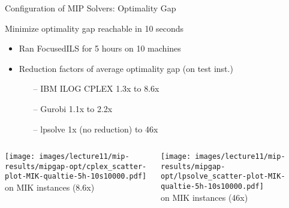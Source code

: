 \begin{frame}[c,fragile]{Configuration of MIP Solvers: Optimality Gap}

\begin{block}{Minimize optimality gap reachable in 10 seconds}
\begin{itemize}
        \item Ran FocusedILS for 5 hours on 10 machines
        

        \item Reduction factors of average optimality gap (on test inst.)
        \begin{itemize}
                \item[--] IBM ILOG CPLEX 1.3x to 8.6x
                \item[--] Gurobi 1.1x to 2.2x
                \item[--] lpsolve 1x (no reduction) to 46x
        \end{itemize}
\end{itemize}
\end{block}
        
\pause        
\vspace*{-0.6cm} 
    \begin{columns}
                                \begin{center}  \texttt{[image: images/lecture11/mip-results/mipgap-opt/cplex\_scatter-plot-MIK-qualtie-5h-10s10000.pdf]}\\
                                \footnotesize{\cplex{} on MIK instances (8.6x)}
                                \end{center}
                                \begin{center}  \texttt{[image: images/lecture11/mip-results/mipgap-opt/lpsolve\_scatter-plot-MIK-qualtie-5h-10s10000.pdf]}\\
                                \footnotesize{\lpsolve{} on MIK instances (46x)}%
                                \end{center}
    \end{columns}
\end{frame}


